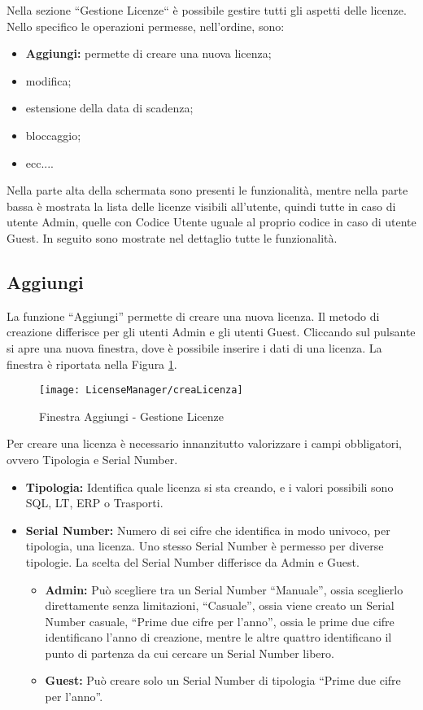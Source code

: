 Nella sezione “Gestione Licenze“ è possibile gestire tutti gli aspetti delle licenze.
Nello specifico le operazioni permesse, nell'ordine, sono:
\begin{itemize}
\item \textbf{Aggiungi:} permette di creare una nuova licenza;
\item modifica;
\item estensione della data di scadenza;
\item bloccaggio;
\item ecc....
\end{itemize} 
Nella parte alta della schermata sono presenti le funzionalità, mentre nella parte bassa è mostrata la lista delle licenze visibili all’utente, quindi tutte in caso di utente Admin, quelle con Codice Utente uguale al proprio codice in caso di utente Guest. In seguito sono mostrate nel dettaglio tutte le funzionalità. 

\subsection{Aggiungi}
La funzione “Aggiungi” permette di creare una nuova licenza. Il metodo di creazione differisce per gli utenti Admin e gli utenti Guest. Cliccando sul pulsante si apre una nuova finestra, dove è possibile inserire i dati di una licenza. La finestra è riportata nella Figura \ref{crealic}.

\begin{figure}[!h] 
    \centering 
    \texttt{[image: LicenseManager/creaLicenza]} 
    \caption{Finestra Aggiungi - Gestione Licenze}
    \label{crealic}
\end{figure}

Per creare una licenza è necessario innanzitutto valorizzare i campi obbligatori, ovvero Tipologia e Serial Number. 
\begin{itemize}

\item \textbf{Tipologia:} Identifica quale licenza si sta creando, e i valori possibili sono SQL, LT, ERP o Trasporti. 
\item \textbf{Serial Number:} Numero di sei cifre che identifica in modo univoco, per tipologia, una licenza. Uno stesso Serial Number è permesso per diverse tipologie. La scelta del Serial Number differisce da Admin e Guest.  
\begin{itemize}

\item	\textbf{Admin:} Può scegliere tra un Serial Number “Manuale”, ossia sceglierlo direttamente senza limitazioni, “Casuale”, ossia viene creato un Serial Number casuale, “Prime due cifre per l’anno”, ossia le prime due cifre identificano l’anno di creazione, mentre le altre quattro identificano il punto di partenza da cui cercare un Serial Number libero.
\item	\textbf{Guest:} Può creare solo un Serial Number di tipologia “Prime due cifre per l’anno”.
\end{itemize}

\end{itemize}	

